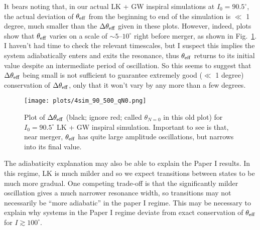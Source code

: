\documentclass[11pt,
        usenames, %
        dvipsnames %
    ]{article}
\begin{document}
It bears noting that, in our actual LK + GW inspiral simulations at $I_0 =
90.5^\circ$, the actual deviation of $\theta_{\rm eff}$ from the beginning to
end of the simulation is $\ll$ 1 degree, much smaller than the $\Delta
\theta_{\rm eff}$ given in these plots. However, indeed, plots show that
$\theta_{\rm eff}$ varies on a scale of $\sim 5$--$10^\circ$ right before
merger, as shown in Fig.~\ref{fig:905qn0}. I haven't had time to check the
relevant timescales, but I suspect this implies the system adiabatically enters
and exits the resonance, thus $\theta_{\rm eff}$ returns to its initial value
despite an intermediate period of oscillation. So this seems to suggest that
$\Delta \theta_{\rm eff}$ being small is not sufficient to guarantee extremely
good ($\ll$ 1 degree) conservation of $\Delta \theta_{\rm eff}$, only that it
won't vary by any more than a few degrees.
\begin{figure}
    \centering
    \texttt{[image: plots/4sim\_90\_500\_qN0.png]}
    \caption{Plot of $\Delta \theta_{\rm eff}$ (black; ignore red; called
    $\theta_{N = 0}$ in this old plot) for $I_0 = 90.5^\circ$ LK + GW inspiral
    simulation. Important to see is that, near merger, $\theta_{\rm eff}$ has
    quite large amplitude oscillations, but narrows into its final
    value.}\label{fig:905qn0}
\end{figure}

The adiabaticity explanation may also be able to explain the Paper I results. In
this regime, LK is much milder and so we expect transitions between states to be
much more gradual. One competing trade-off is that the significantly milder
oscillation gives a much narrower resonance width, so transitions may not
necessarily be ``more adiabatic'' in the paper I regime. This may be necessary
to explain why systems in the Paper I regime deviate from exact conservation of
$\theta_{\rm eff}$ for $I \gtrsim 100^\circ$.
\end{document}
